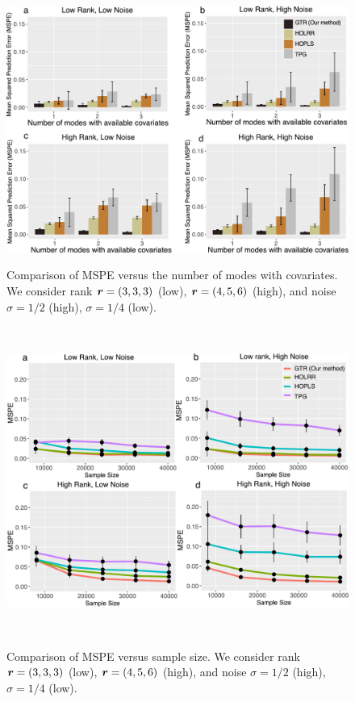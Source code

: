 \documentclass{article}
\theoremstyle{plain}
\theoremstyle{definition}
\begin{document}
\begin{figure}[htbp]
\centering
\begin{minipage}[t]{0.47\textwidth}
\centering
\includegraphics[width=1\textwidth]{merge.pdf}
\caption{Comparison of MSPE versus the number of modes with covariates. We consider rank $\bm{r}=(3,3,3)$ (low), $\bm{r}=(4,5,6)$ (high), and noise $\sigma=1/2$ (high), $\sigma=1/4$ (low).}~\label{fig:compare}
\end{minipage}
\hspace{.5cm}
\begin{minipage}[t]{0.47\textwidth}
\centering
\includegraphics[width=1\textwidth]{merge2.pdf}
\caption{Comparison of MSPE versus sample size. We consider rank $\bm{r}=(3,3,3)$ (low), $\bm{r}=(4,5,6)$ (high), and noise $\sigma=1/2$ (high), $\sigma=1/4$ (low). }~\label{fig:compare2}
\end{minipage}
\vspace{-.5cm}
\end{figure}
\end{document}
